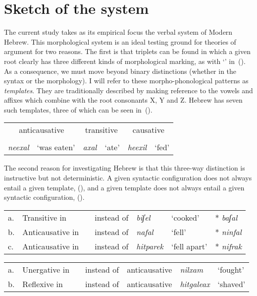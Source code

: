 \section{Sketch of the system}
The current study takes as its empirical focus the verbal system of Modern Hebrew. This morphological system is an ideal testing ground for theories of argument for two reasons. The first is that triplets can be found in which a given root clearly has three different kinds of morphological marking, as with  `' in~(\nextx). As a consequence, we must move beyond binary distinctions (whether in the syntax or the morphology). I will refer to these morpho-phonological patterns as \emph{templates}. They are traditionally described by making reference to the vowels and affixes which combine with the root consonants X, Y and Z. Hebrew has seven such templates, three of which can be seen in~(\nextx).
\ex\label{ex:alternations-heb}
	\begin{tabular}{llllll}
	\multicolumn{2}{c}{anticausative}	&	\multicolumn{2}{c}{transitive}	& \multicolumn{2}{c}{causative}\\
	\multicolumn{2}{c}{\tnif}	&	\multicolumn{2}{c}{\tkal}	& \multicolumn{2}{c}{\thif}\\
	\emph{neexal}	& `was eaten'	&	\emph{axal}	& `ate'	&	\emph{heexil}	& `fed'\\
	\end{tabular}
\xe

The second reason for investigating Hebrew is that this three-way distinction is instructive but not deterministic. A given syntactic configuration does not always entail a given template, (\nextx), and a given template does not always entail a given syntactic configuration, (\anextx).
\ex\label{ex:counter1}
	\begin{tabular}{lllllll}
	a.& Transitive in & \tpie & instead of \tkal 		& \emph{biʃel} & `cooked'	& * \emph{baʃal}\\
	b.& Anticausative in & \tkal & instead of \tnif	& \emph{nafal}	& `fell'		& * \emph{ninfal}\\
	c.& Anticausative in & \thit & instead  of \tnif & \emph{hitparek} & `fell apart'	& * \emph{nifrak}\\
	\end{tabular}
\xe
\pex\label{ex:counter2}
	\begin{tabular}{lllllll}
	a.& Unergative in & \tnif & instead of & anticausative & \emph{nilxam} & `fought'\\
	b.&	Reflexive in & \thit & instead of & anticausative & \emph{hitgaleax} & `shaved'\\
	\end{tabular}
\xe

